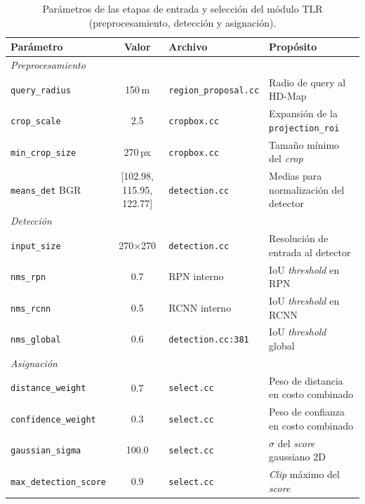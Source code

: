 \begin{table}[H]
\centering
\footnotesize
\begin{tabularx}{\textwidth}{|l|c|l|X|}
\hline
\textbf{Parámetro} & \textbf{Valor} & \textbf{Archivo} & \textbf{Propósito} \\
\hline
\multicolumn{4}{|l|}{\textit{Preprocesamiento}} \\
\hline
\texttt{query\_radius} & 150\,m & \texttt{region\_proposal.cc} & Radio de query al HD-Map \\
\texttt{crop\_scale} & 2.5 & \texttt{cropbox.cc} & Expansión de la \texttt{projection\_roi} \\
\texttt{min\_crop\_size} & 270\,px & \texttt{cropbox.cc} & Tamaño mínimo del \textit{crop} \\
\texttt{means\_det} BGR & [102.98, 115.95, 122.77] & \texttt{detection.cc} & Medias para normalización del detector \\
\hline
\multicolumn{4}{|l|}{\textit{Detección}} \\
\hline
\texttt{input\_size} & 270$\times$270 & \texttt{detection.cc} & Resolución de entrada al detector \\
\texttt{nms\_rpn} & 0.7 & RPN interno & IoU \textit{threshold} en RPN \\
\texttt{nms\_rcnn} & 0.5 & RCNN interno & IoU \textit{threshold} en RCNN \\
\texttt{nms\_global} & 0.6 & \texttt{detection.cc:381} & IoU \textit{threshold} global \\
\hline
\multicolumn{4}{|l|}{\textit{Asignación}} \\
\hline
\texttt{distance\_weight} & 0.7 & \texttt{select.cc} & Peso de distancia en costo combinado \\
\texttt{confidence\_weight} & 0.3 & \texttt{select.cc} & Peso de confianza en costo combinado \\
\texttt{gaussian\_sigma} & 100.0 & \texttt{select.cc} & $\sigma$ del \textit{score} gaussiano 2D \\
\texttt{max\_detection\_score} & 0.9 & \texttt{select.cc} & \textit{Clip} máximo del \textit{score} \\
\hline
\end{tabularx}
\caption{Parámetros de las etapas de entrada y selección del módulo TLR (preprocesamiento, detección y asignación).}
\label{tab:parametros_pre}
\end{table}

